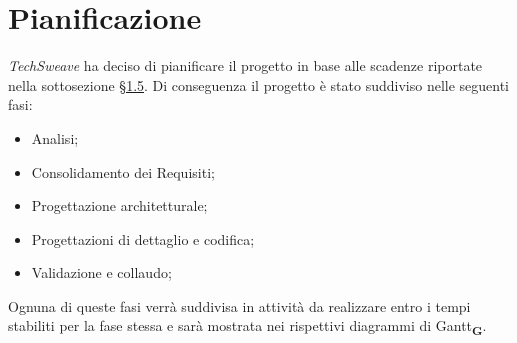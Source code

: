 \section{Pianificazione}
    \textit{TechSweave} ha deciso di pianificare il progetto in base alle scadenze riportate nella sottosezione \hyperref[sec:scadenze]{§1.5}. Di conseguenza il progetto è stato suddiviso nelle seguenti fasi:
    \begin {itemize}
        \item Analisi;
        \item Consolidamento dei Requisiti;
        \item Progettazione architetturale;
        \item Progettazioni di dettaglio e codifica;
        \item Validazione e collaudo;
    \end {itemize}
    Ognuna di queste fasi verrà suddivisa in attività da realizzare entro i tempi stabiliti per la fase stessa e sarà mostrata nei rispettivi diagrammi di Gantt\textsubscript{\textbf{G}}.
